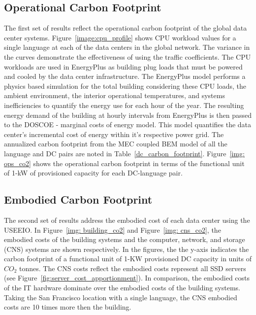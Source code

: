     \subsection{Operational Carbon Footprint}
    The first set of results reflect the operational carbon footprint of the global data center systems. Figure~\ref{image:cpu_profile} shows CPU workload values for a single language at each of the data centers in the global network. The variance in the curves demonstrate the effectiveness of using the traffic coefficients. The CPU workloads are used in EnergyPlus as building plug loads that must be powered and cooled by the data center infrastructure. The EnergyPlus model performs a physics based simulation for the total building considering these CPU loads, the ambient environment, the interior operational temperatures, and systems inefficiencies to quantify the energy use for each hour of the year. The resulting energy demand of the building at hourly intervals from EnergyPlus is then passed to the DOSCOE - marginal costs of energy model. This model quantifies the data center's incremental cost of energy within it's respective power grid. The annualized carbon footprint from the MEC coupled BEM model of all the  language and DC pairs are noted in Table~\ref{dc_carbon_footprint}. Figure~\ref{img: ops_co2} shows the operational carbon footprint in terms of the functional unit of 1-kW of provisioned capacity for each DC-language pair.

    
    
    
    
    
     
    

    
    \subsection{Embodied Carbon Footprint}
    The second set of results address the embodied cost of each data center using the USEEIO. In Figure~\ref{img: building_co2} and Figure~\ref{img: cns_co2}, the embodied costs of the building systems and the computer, network, and storage (CNS) systems are shown respectively.  In the figures, the the y-axis indicates the carbon footprint of a functional unit of 1-KW provisioned DC capacity in units of $CO_2$ tonnes. The CNS costs reflect the embodied costs represent all SSD servers (see Figure~\ref{fig:server_cost_apportionment}). In comparison, the embodied costs of the IT hardware dominate over the embodied costs of the building systems. Taking the San Francisco location with a single language, the CNS embodied costs are 10 times more then the building. 
    
